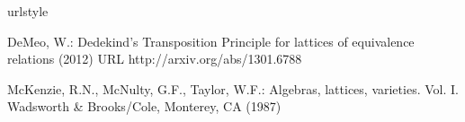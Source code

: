 \documentclass{au}
\theoremstyle{plain}
\newcommand{\<}{\ensuremath{\langle}}
\renewcommand{\>}{\ensuremath{\rangle}}
\begin{document}


\def\cprime{$'$} \def\cprime{$'$}
  \def\ocirc#1{\ifmmode\setbox0=\hbox{$#1$}\dimen0=\ht0 \advance\dimen0
  by1pt\rlap{\hbox to\wd0{\hss\raise\dimen0
  \hbox{\hskip.2em$\scriptscriptstyle\circ$}\hss}}#1\else {\accent"17 #1}\fi}
\begin{thebibliography}{1}
\providecommand{\url}[1]{{#1}}
\providecommand{\urlprefix}{URL }
\expandafter\ifx\csname urlstyle\endcsname\relax
  \providecommand{\doi}[1]{DOI~\discretionary{}{}{}#1}\else
  \providecommand{\doi}{DOI~\discretionary{}{}{}\begingroup
  \urlstyle{rm}\Url}\fi

DeMeo, W.: {D}edekind's {T}ransposition {P}rinciple for lattices of equivalence
  relations (2012)
\newblock \urlprefix\url{http://arxiv.org/abs/1301.6788}

McKenzie, R.N., McNulty, G.F., Taylor, W.F.: Algebras, lattices, varieties.
  {V}ol. {I}.
\newblock Wadsworth \& Brooks/Cole, Monterey, CA (1987)

\end{thebibliography}
\end{document}
